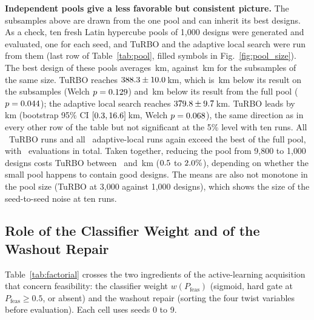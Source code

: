 \textbf{Independent pools give a less favorable but consistent picture.} The subsamples above are drawn from the one pool and can inherit its best designs. As a check, ten fresh Latin hypercube pools of 1{,}000 designs were generated and evaluated, one for each seed, and TuRBO and the adaptive local search were run from them (last row of Table~\ref{tab:pool}, filled symbols in Fig.~\ref{fig:pool_size}). The best design of these pools averages \NpIndPoolBest\,km, against \NpPoolBBest\,km for the subsamples of the same size. TuRBO reaches $388.3 \pm 10.0$\,km, which is \NpIndTurboVsSubAbs\,km below its result on the subsamples (Welch $p = 0.129$) and \NpIndTurboVsFull\,km below its result from the full pool ($p = 0.044$); the adaptive local search reaches $379.8 \pm 9.7$\,km. TuRBO leads by \NpIndTvAD\,km (bootstrap 95\% CI $[0.3, 16.6]$\,km, Welch $p = 0.068$), the same direction as in every other row of the table but not significant at the 5\% level with ten runs. All \NpIndTurboBeatFull\ TuRBO runs and all \NpIndAdaptBeatFull\ adaptive-local runs again exceed the best of the full pool, with \NpIndEvals\ evaluations in total. Taken together, reducing the pool from 9{,}800 to 1{,}000 designs costs TuRBO between \NpTurboLossB\ and \NpIndTurboVsFull\,km ($0.5$ to $2.0\%$), depending on whether the small pool happens to contain good designs. The means are also not monotone in the pool size (TuRBO at 3{,}000 against 1{,}000 designs), which shows the size of the seed-to-seed noise at ten runs.

\subsection{Role of the Classifier Weight and of the Washout Repair}
\label{sec:feas_ablation}
Table~\ref{tab:factorial} crosses the two ingredients of the active-learning acquisition that concern feasibility: the classifier weight $w(P_{\mathrm{feas}})$ (sigmoid, hard gate at $P_{\mathrm{feas}} \ge 0.5$, or absent) and the washout repair (sorting the four twist variables before evaluation). Each cell uses seeds 0 to 9.

\begin{table}[htbp]
\centering\small
\caption{Feasibility handling in the active-learning acquisition, ten seeds per row (TuRBO: 20, as in Table~\ref{tab:budget}), and the effect of adding the sigmoid weight to TuRBO (TuRBO+w). ``Sigmoid'', ``hard gate'' and ``none'' are the forms of the classifier weight and ``+R'' is the washout repair. Columns as in Table~\ref{tab:budget}.}
\label{tab:factorial}

\end{table}

